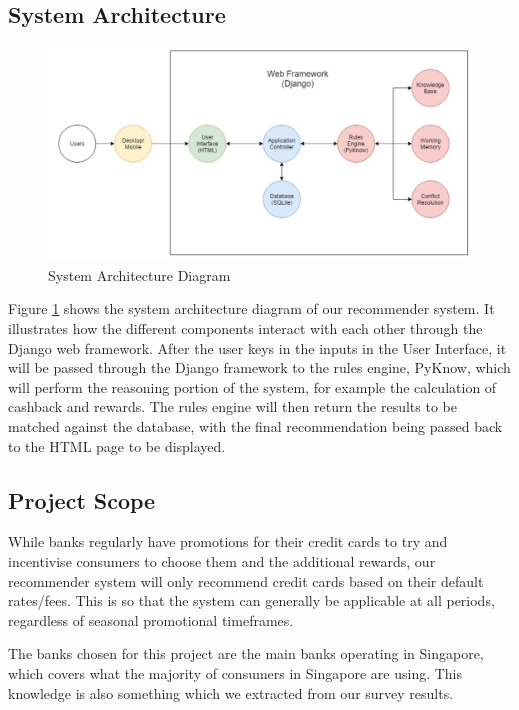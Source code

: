 \subsection{System Architecture} %
\label{sub:system_architecture}
	\begin{figure}[h]
		\centering
		\includegraphics[width=\linewidth]{img/SystemArchitectureDiagram1a.jpg}
		\caption{System Architecture Diagram}
		\label{fig:system_architecture_diagram}
	\end{figure}
	Figure \ref{fig:system_architecture_diagram} shows the system architecture diagram of our recommender system. It illustrates how the different components interact with each other through the Django web framework. After the user keys in the inputs in the User Interface, it will be passed through the Django framework to the rules engine, PyKnow, which will perform the reasoning portion of the system, for example the calculation of cashback and rewards. The rules engine will then return the results to be matched against the database, with the final recommendation being passed back to the HTML page to be displayed.


\subsection{Project Scope} %
\label{sub:project_scope}
While banks regularly have promotions for their credit cards to try and incentivise consumers to choose them and the additional rewards, our recommender system will only recommend credit cards based on their default rates/fees. This is so that the system can generally be applicable at all periods, regardless of seasonal promotional timeframes.

The banks chosen for this project are the main banks operating in Singapore, which covers what the majority of consumers in Singapore are using. This knowledge is also something which we extracted from our survey results.

